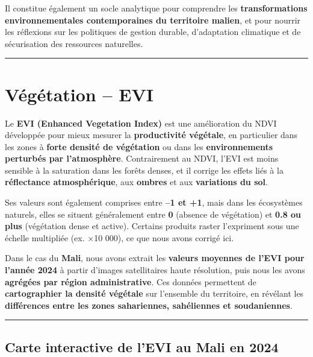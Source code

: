 \documentclass[
]{book}
\begin{document}
Il constitue également un socle analytique pour comprendre les \textbf{transformations environnementales contemporaines du territoire malien}, et pour nourrir les réflexions sur les politiques de gestion durable, d'adaptation climatique et de sécurisation des ressources naturelles.

\begin{center}\rule{0.5\linewidth}{0.5pt}\end{center}

\section{Végétation -- EVI}\label{vuxe9guxe9tation-evi}

Le \textbf{EVI (Enhanced Vegetation Index)} est une amélioration du NDVI développée pour mieux mesurer la \textbf{productivité végétale}, en particulier dans les zones à \textbf{forte densité de végétation} ou dans les \textbf{environnements perturbés par l'atmosphère}. Contrairement au NDVI, l'EVI est moins sensible à la saturation dans les forêts denses, et il corrige les effets liés à la \textbf{réflectance atmosphérique}, aux \textbf{ombres} et aux \textbf{variations du sol}.

Ses valeurs sont également comprises entre \textbf{--1 et +1}, mais dans les écosystèmes naturels, elles se situent généralement entre \textbf{0} (absence de végétation) et \textbf{0.8 ou plus} (végétation dense et active). Certains produits raster l'expriment sous une échelle multipliée (ex. ×10 000), ce que nous avons corrigé ici.

Dans le cas du \textbf{Mali}, nous avons extrait les \textbf{valeurs moyennes de l'EVI pour l'année 2024} à partir d'images satellitaires haute résolution, puis nous les avons \textbf{agrégées par région administrative}. Ces données permettent de \textbf{cartographier la densité végétale} sur l'ensemble du territoire, en révélant les \textbf{différences entre les zones sahariennes, sahéliennes et soudaniennes}.

\begin{center}\rule{0.5\linewidth}{0.5pt}\end{center}

\subsection{Carte interactive de l'EVI au Mali en 2024}\label{carte-interactive-de-levi-au-mali-en-2024}
\end{document}
